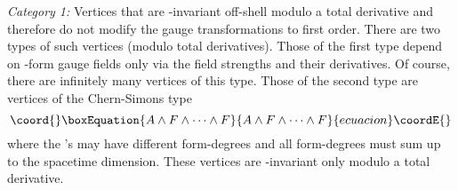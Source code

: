 \documentclass[a4paper,12pt]{article}
\begin{document}
{\em Category 1:} Vertices that are 
\coordHE{}-invariant off-shell
modulo a total derivative and therefore
do not modify the gauge transformations to first order. 
There are
two types of such vertices (modulo total derivatives). 
Those of the first type 
depend on \coordHE{}-form gauge fields only via
the field strengths \coordHE{} and their derivatives.
Of course, there are infinitely many vertices of this type.
Those of the second type are vertices of the
Chern-Simons type
\begin{equation}\coord{}\boxEquation{
A\wedge F\wedge\dots\wedge F
\label{bra-CS}
}{
A\wedge F\wedge\dots\wedge F
}{ecuacion}\coordE{}\end{equation}
where the \coordHE{}'s may have different form-degrees
and all form-degrees must sum up to the spacetime dimension.
These vertices are \coordHE{}-invariant only modulo a
total derivative.
\end{document}
